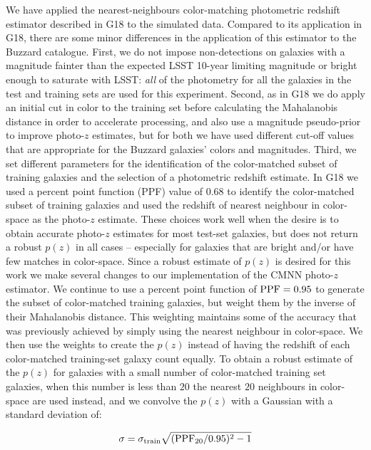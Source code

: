 \documentclass[usenatbib]{mn2e}
\begin{document}
We have applied the nearest-neighbours color-matching photometric redshift estimator described in G18 to the simulated data. Compared to its application in G18, there are some minor differences in the application of this estimator to the Buzzard catalogue. First, we do not impose non-detections on galaxies with a magnitude fainter than the expected LSST 10-year limiting magnitude or bright enough to saturate with LSST: {\it all} of the photometry for all the galaxies in the test and training sets are used for this experiment. Second, as in G18 we do apply an initial cut in color to the training set before calculating the Mahalanobis distance in order to accelerate processing, and also use a magnitude pseudo-prior to improve photo-$z$ estimates, but for both we have used different cut-off values that are appropriate for the Buzzard galaxies' colors and magnitudes. Third, we set different parameters for the identification of the color-matched subset of training galaxies and the selection of a photometric redshift estimate. In G18 we used a percent point function (PPF) value of 0.68 to identify the color-matched subset of training galaxies and used the redshift of nearest neighbour in color-space as the photo-$z$ estimate. These choices work well when the desire is to obtain accurate photo-$z$ estimates for most test-set galaxies, but does not return a robust $p(z)$ in all cases -- especially for galaxies that are bright and/or have few matches in color-space. Since a robust estimate of $p(z)$ is desired for this work we make several changes to our implementation of the \textsc{CMNN} photo-$z$ estimator. We continue to use a percent point function of ${\rm PPF} = 0.95$ to generate the subset of color-matched training galaxies, but weight them by the inverse of their Mahalanobis distance. This weighting maintains some of the accuracy that was previously achieved by simply using the nearest neighbour in color-space. We then use the weights to create the $p(z)$ instead of having the redshift of each color-matched training-set galaxy count equally. To obtain a robust estimate of the $p(z)$ for galaxies with a small number of color-matched training set galaxies, when this number is less than $20$ the nearest $20$ neighbours in color-space are used instead, and we convolve the $p(z)$ with a Gaussian with a standard deviation of:

\begin{equation}
\sigma = \sigma_{\rm train} \sqrt{({\rm PPF}_{20}/0.95)^2 -1}
\end{equation}
\end{document}
